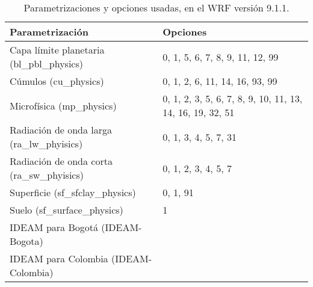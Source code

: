 \begin{itemize}
\begin{table}[H]
\caption{Parametrizaciones y opciones usadas, en el WRF versión 9.1.1.}
\label{tabla_parametrizacion_opciones}
\begin{tabular}{lp{8cm}}
Parametrización & Opciones \\ \hline
Capa límite planetaria (bl\_pbl\_physics) & 0, 1, 5, 6, 7, 8, 9, 11, 12, 99 \\ %
Cúmulos (cu\_physics)      & 0, 1, 2, 6, 11, 14, 16, 93, 99 \\ %
Microfísica (mp\_physics)      & 0, 1, 2, 3, 5, 6, 7, 8, 9, 10, 11, 13, 14, 16, 19, 32, 51 \\%
Radiación de onda larga (ra\_lw\_phyisics) & 0, 1, 3, 4, 5, 7, 31 \\%
Radiación de onda corta (ra\_sw\_phyisics) & 0, 1, 2, 3, 4, 5, 7 \\%
Superficie (sf\_sfclay\_physics) & 0, 1, 91\\ %
Suelo (sf\_surface\_physics) & 1 \\ %
IDEAM para Bogotá (IDEAM-Bogota) & \\
IDEAM para Colombia (IDEAM-Colombia) & \\ %
\end{tabular}
\end{table}



\end{itemize}
